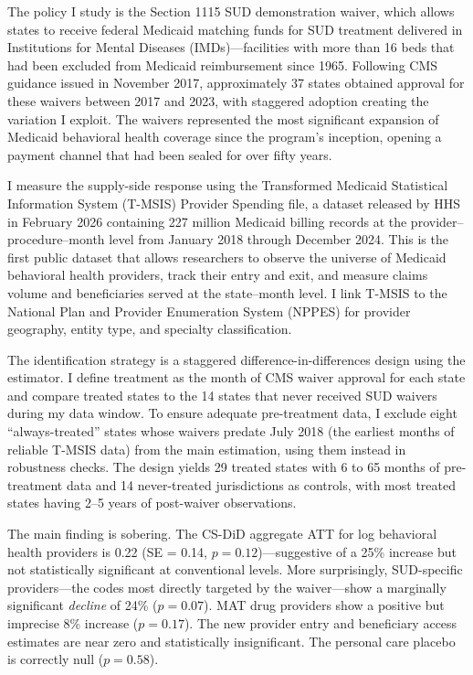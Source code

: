 \documentclass[12pt]{article}
\begin{document}
The policy I study is the Section 1115 SUD demonstration waiver, which allows states to receive federal Medicaid matching funds for SUD treatment delivered in Institutions for Mental Diseases (IMDs)---facilities with more than 16 beds that had been excluded from Medicaid reimbursement since 1965. Following CMS guidance issued in November 2017, approximately 37 states obtained approval for these waivers between 2017 and 2023, with staggered adoption creating the variation I exploit. The waivers represented the most significant expansion of Medicaid behavioral health coverage since the program's inception, opening a payment channel that had been sealed for over fifty years.

I measure the supply-side response using the Transformed Medicaid Statistical Information System (T-MSIS) Provider Spending file, a dataset released by HHS in February 2026 containing 227 million Medicaid billing records at the provider--procedure--month level from January 2018 through December 2024. This is the first public dataset that allows researchers to observe the universe of Medicaid behavioral health providers, track their entry and exit, and measure claims volume and beneficiaries served at the state--month level. I link T-MSIS to the National Plan and Provider Enumeration System (NPPES) for provider geography, entity type, and specialty classification.

The identification strategy is a staggered difference-in-differences design using the \citet{callaway2021difference} estimator. I define treatment as the month of CMS waiver approval for each state and compare treated states to the 14 states that never received SUD waivers during my data window. To ensure adequate pre-treatment data, I exclude eight ``always-treated'' states whose waivers predate July 2018 (the earliest months of reliable T-MSIS data) from the main estimation, using them instead in robustness checks. The design yields 29 treated states with 6 to 65 months of pre-treatment data and 14 never-treated jurisdictions as controls, with most treated states having 2--5 years of post-waiver observations.

The main finding is sobering. The CS-DiD aggregate ATT for log behavioral health providers is 0.22 (SE = 0.14, $p = 0.12$)---suggestive of a 25\% increase but not statistically significant at conventional levels. More surprisingly, SUD-specific providers---the codes most directly targeted by the waiver---show a marginally significant \textit{decline} of 24\% ($p = 0.07$). MAT drug providers show a positive but imprecise 8\% increase ($p = 0.17$). The new provider entry and beneficiary access estimates are near zero and statistically insignificant. The personal care placebo is correctly null ($p = 0.58$).
\end{document}
